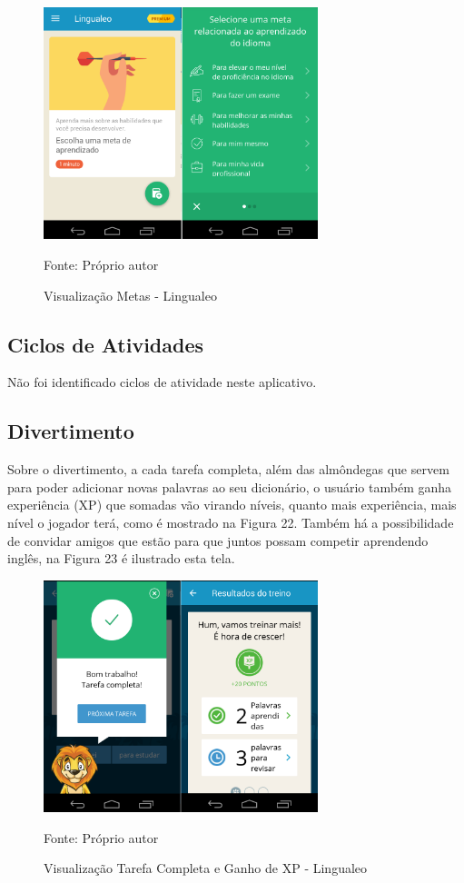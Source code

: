 \documentclass[
	12pt,				%
	openany,			%
	oneside,			%
	a4paper,			%
	english,			%
	french,				%
	spanish,			%
	brazil				%
	]{abntex2}
\begin{document}
\begin{figure}[H]
    \centering
\caption{Visualização Metas - Lingualeo}
\includegraphics[width=8cm]{figuras/metalingualeo.png}
\par
 Fonte: Próprio autor
\end{figure}

\subsection{Ciclos de Atividades}
Não foi identificado ciclos de atividade neste aplicativo.

\subsection{Divertimento}
	Sobre o divertimento, a cada tarefa completa, além das almôndegas que servem para poder adicionar novas palavras ao seu dicionário, o usuário também ganha experiência (XP) que somadas vão virando níveis, quanto mais experiência, mais nível o jogador terá, como é mostrado na Figura 22.
Também há a possibilidade de convidar amigos que estão para que juntos possam competir aprendendo inglês, na Figura 23 é ilustrado esta tela.

\begin{figure}[H]
    \centering
\caption{Visualização Tarefa Completa e Ganho de XP - Lingualeo}
\includegraphics[width=8cm]{figuras/completalingualeo.png}
\par
 Fonte: Próprio autor
\end{figure}
\end{document}

